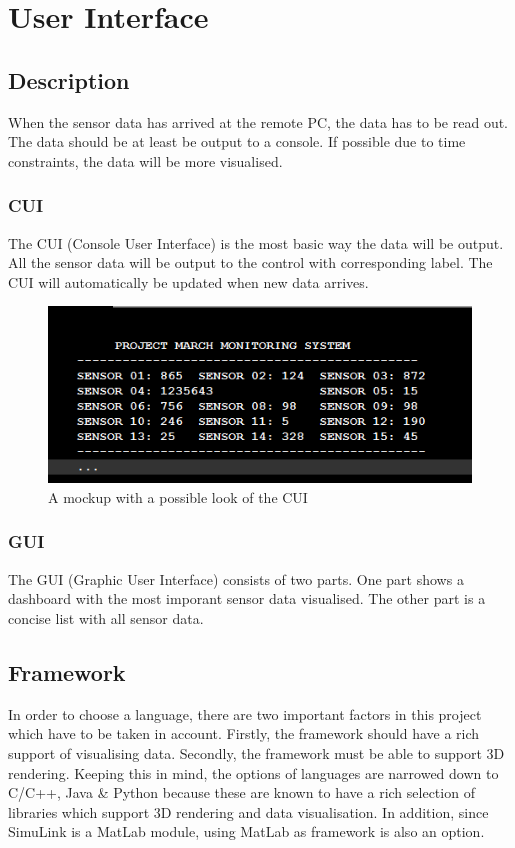 \section{User Interface}
\subsection{Description}
When the sensor data has arrived at the remote PC, the data has to be read out. The data should be at least be output to a console. If possible due to time constraints, the data will be more visualised.
\subsubsection{CUI}
The CUI (Console User Interface) is the most basic way the data will be output. All the sensor data will be output to the control with corresponding label. The CUI will automatically be updated when new data arrives. 
\begin{figure}[H]
	\includegraphics{MockupCUI}
	\caption{A mockup with a possible look of the CUI} 
\end{figure} 
\subsubsection{GUI}
The GUI (Graphic User Interface) consists of two parts. One part shows a dashboard with the most imporant sensor data visualised. The other part is a concise list with all sensor data.  
\subsection{Framework}
In order to choose a language, there are two important factors in this project which have to be taken in account. Firstly, the framework should have a rich support of visualising data. Secondly, the framework must be able to support 3D rendering. Keeping this in mind, the options of languages are narrowed down to C/C++, Java \& Python because these are known to have a rich selection of libraries which support 3D rendering and data visualisation. In addition, since SimuLink is a MatLab module, using MatLab as framework is also an option. 

